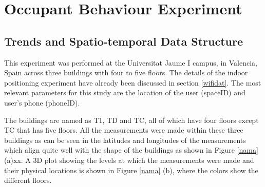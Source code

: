 



\hspace{1 cm}

\section{Occupant Behaviour Experiment}
\subsection{Trends and Spatio-temporal Data Structure}

This experiment was performed at the Universitat Jaume I campus, in Valencia, Spain across three buildings with four to five floors. The details of the indoor positioning experiment have already been discussed in section \ref{wifidat}. The most relevant parameters for this study are the location of the user (spaceID) and user's phone (phoneID). 

The buildings are named as T1, TD and TC, all of which have four floors except TC that has five floors. All the measurements were made within these three buildings as can be seen in the latitudes and longitudes of the measurements which align quite well with the shape of the buildings as shown in Figure \ref{nama} (a)xx. A 3D plot showing the levels at which the measurements were made and their physical locations is shown in  Figure \ref{nama} (b), where the colors show the different floors. 

